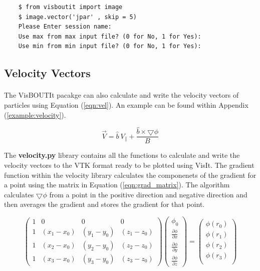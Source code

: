 \documentclass[12pt,a4paper]{article}
\begin{document}
\begin{verbatim}
	$ from visboutit import image
	$ image.vector('jpar' , skip = 5)
	Please Enter session name: 
	Use max from max input file? (0 for No, 1 for Yes):
	Use min from min input file? (0 for No, 1 for Yes):
\end{verbatim}

\subsection{Velocity Vectors}
\label{sec:velocity}
\paragraph{}
The VisBOUTIt pacakge can also calculate and write the velocity vectors of particles using Equation (\ref{eqn:vel}). An example can be found within Appendix (\ref{example:velocity}).

\begin{equation}
\label{eqn:vel}
\vec{V} = \hat{b} \ {V_{\parallel}} + \frac{\hat{b} \times\bigtriangledown \phi}{B}
\end{equation}

The \textbf{velocity.py} library contains all the functions to calculate and write the velocity vectors to the VTK format ready to be plotted using VisIt. The gradient function within the velocity library calculates the componenets of the gradient for a point using the matrix in Equation (\ref{eqn:grad_matrix}). The algorithm calculates $\bigtriangledown\phi$ from a point in the positive direction and negative direction and then averages the gradient and stores the gradient for that point.

\begin{equation}
\label{eqn:grad_matrix}
\begin{pmatrix}
1 & 0 & 0 & 0 \\
1 & (x_{1} - x_{0}) & (y_{1} - y_{0}) & (z_{1} - z_{0}) \\
1 & (x_{2} - x_{0}) & (y_{2} - y_{0}) & (z_{2} - z_{0}) \\
1 & (x_{3} - x_{0}) & (y_{3} - y_{0}) & (z_{3} - z_{0}) 
\end{pmatrix}
\begin{pmatrix}
\phi_{0} \\
\frac{\partial \phi}{\partial x} \\
\frac{\partial \phi}{\partial y} \\
\frac{\partial \phi}{\partial z}
\end{pmatrix}
=
\begin{pmatrix}
\phi(r_{0}) \\
\phi(r_{1}) \\
\phi(r_{2}) \\
\phi(r_{3}) \\
\end{pmatrix}
\end{equation}
\end{document}

